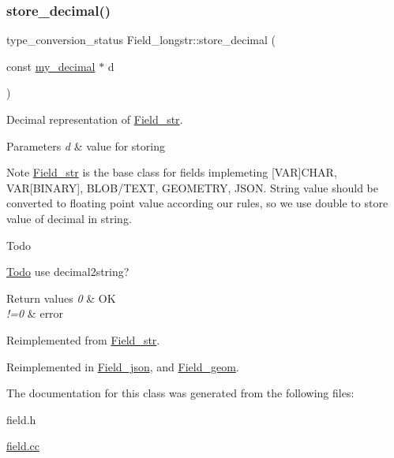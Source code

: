 \subsubsection{\texorpdfstring{store\+\_\+decimal()}{store\_decimal()}}
{\footnotesize\ttfamily type\+\_\+conversion\+\_\+status Field\+\_\+longstr\+::store\+\_\+decimal (\begin{DoxyParamCaption}\item[{const \mbox{\hyperlink{classmy__decimal}{my\+\_\+decimal}} $\ast$}]{d }\end{DoxyParamCaption})\hspace{0.3cm}{\ttfamily [virtual]}}

Decimal representation of \mbox{\hyperlink{classField__str}{Field\+\_\+str}}.


\begin{DoxyParams}{Parameters}
{\em d} & value for storing\\
\hline
\end{DoxyParams}
\begin{DoxyNote}{Note}
\mbox{\hyperlink{classField__str}{Field\+\_\+str}} is the base class for fields implemeting \mbox{[}V\+AR\mbox{]}C\+H\+AR, V\+AR\mbox{[}B\+I\+N\+A\+RY\mbox{]}, B\+L\+O\+B/\+T\+E\+XT, G\+E\+O\+M\+E\+T\+RY, J\+S\+ON. String value should be converted to floating point value according our rules, so we use double to store value of decimal in string.
\end{DoxyNote}
\begin{DoxyRefDesc}{Todo}
\item[\mbox{\hyperlink{todo__todo000011}{Todo}}]use decimal2string?\end{DoxyRefDesc}



\begin{DoxyRetVals}{Return values}
{\em 0} & OK \\
\hline
{\em !=0} & error \\
\hline
\end{DoxyRetVals}


Reimplemented from \mbox{\hyperlink{classField__str_ae0a260a3e657aa6778dcf651ff3e9b95}{Field\+\_\+str}}.



Reimplemented in \mbox{\hyperlink{classField__json_a979954944f1ee5334945f83135acdb8e}{Field\+\_\+json}}, and \mbox{\hyperlink{classField__geom_a898e7030c139559c40683399075788a5}{Field\+\_\+geom}}.



The documentation for this class was generated from the following files\+:\begin{DoxyCompactItemize}
\item 
field.\+h\item 
\mbox{\hyperlink{field_8cc}{field.\+cc}}\end{DoxyCompactItemize}
